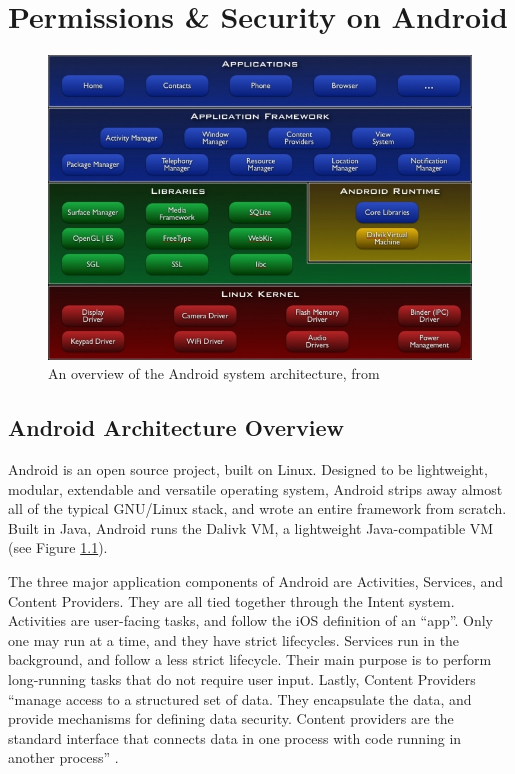 \chapter{Permissions \& Security on Android}
\label{sec:permissions}

\begin{figure}[t]
\begin{center}
\includegraphics[width=0.7\columnwidth]{figs/system-architecture}
\caption{An overview of the Android system architecture, from \citep{androidarchitectureoverview}}
\label{fig:androidoverview}
\end{center}
\end{figure}


\section{Android Architecture Overview}
Android is an open source project, built on Linux. Designed to be lightweight, modular, extendable and versatile operating system, Android strips away almost all of the typical GNU/Linux stack, and wrote an entire framework from scratch. Built in Java, Android runs the Dalivk VM, a lightweight Java-compatible VM (see Figure \ref{fig:androidoverview}). 

The three major application components of Android are Activities, Services, and Content Providers. They are all tied together through the Intent system. Activities are user-facing tasks, and follow the iOS definition of an ``app''. Only one may run at a time, and they have strict lifecycles. Services run in the background, and follow a less strict lifecycle. Their main purpose is to perform long-running tasks that do not require user input. Lastly, Content Providers ``manage access to a structured set of data. They encapsulate the data, and provide mechanisms for defining data security. Content providers are the standard interface that connects data in one process with code running in another process'' \citep{androidcontentproviders}.

